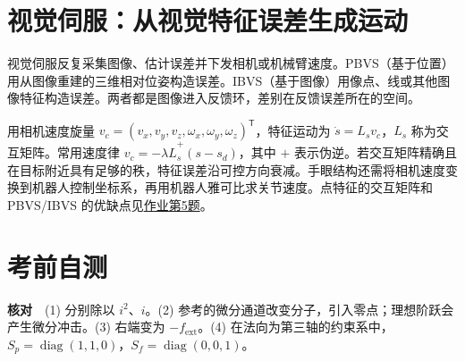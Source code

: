 
\section{视觉伺服：从视觉特征误差生成运动}
\label{sec:visual-servo}
视觉伺服反复采集图像、估计误差并下发相机或机械臂速度。PBVS（基于位置）用从图像重建的三维相对位姿构造误差。IBVS（基于图像）用像点、线或其他图像特征构造误差。两者都是图像进入反馈环，差别在反馈误差所在的空间。

用相机速度旋量 $v_c=(v_x,v_y,v_z,\omega_x,\omega_y,\omega_z)^{\mathsf T}$，特征运动为 $\dot s=L_s v_c$，$L_s$ 称为交互矩阵。常用速度律 $v_c=-\lambda\widehat L_s^+(s-s_d)$，其中 $+$ 表示伪逆。若交互矩阵精确且在目标附近具有足够的秩，特征误差沿可控方向衰减。手眼结构还需将相机速度变换到机器人控制坐标系，再用机器人雅可比求关节速度。点特征的交互矩阵和 PBVS/IBVS 的优缺点见\hyperref[hw:control-5]{作业第5题}。

\section{考前自测}
\noindent\textbf{核对}　(1) 分别除以 $i^2$、$i$。(2) 参考的微分通道改变分子，引入零点；理想阶跃会产生微分冲击。(3) 右端变为 $-f_{\mathrm{ext}}$。(4) 在法向为第三轴的约束系中，$S_p=\operatorname{diag}(1,1,0)$，$S_f=\operatorname{diag}(0,0,1)$。
